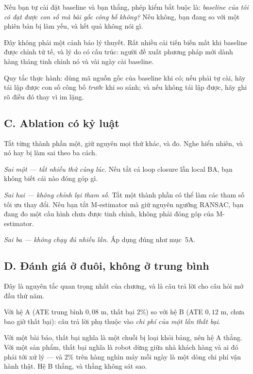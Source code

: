 \documentclass[../../vslam.tex]{subfiles}
\begin{document}
Nếu bạn tự cài đặt baseline và bạn thắng, phép kiểm bắt buộc là: \emph{baseline của tôi có đạt được con số mà bài gốc công bố không?} Nếu không, bạn đang so với một phiên bản bị làm yếu, và kết quả không nói gì.

Đây không phải một cảnh báo lý thuyết. Rất nhiều cải tiến biến mất khi baseline được chỉnh tử tế, và lý do có cấu trúc: người đề xuất phương pháp mới dành hàng tháng tinh chỉnh nó và vài ngày cài baseline.

Quy tắc thực hành: dùng mã nguồn gốc của baseline khi có; nếu phải tự cài, hãy tái lập được con số công bố \emph{trước} khi so sánh; và nếu không tái lập được, hãy ghi rõ điều đó thay vì im lặng.

\subsection{C. Ablation có kỷ luật}

Tắt từng thành phần một, giữ nguyên mọi thứ khác, và đo. Nghe hiển nhiên, và nó hay bị làm sai theo ba cách.

\emph{Sai một --- tắt nhiều thứ cùng lúc.} Nếu tắt cả loop closure lẫn local BA, bạn không biết cái nào đóng góp gì.

\emph{Sai hai --- không chỉnh lại tham số.} Tắt một thành phần có thể làm các tham số tối ưu thay đổi. Nếu bạn tắt M-estimator mà giữ nguyên ngưỡng RANSAC, bạn đang đo một cấu hình chưa được tinh chỉnh, không phải đóng góp của M-estimator.

\emph{Sai ba --- không chạy đủ nhiều lần.} Áp dụng đúng như mục~5A.

\subsection{D. Đánh giá ở đuôi, không ở trung bình}

Đây là nguyên tắc quan trọng nhất của chương, và là câu trả lời cho câu hỏi mở đầu thứ năm.

Với hệ A (ATE trung bình \(0{,}08\) m, thất bại \(2\%\)) so với hệ B (ATE \(0{,}12\) m, chưa bao giờ thất bại): câu trả lời phụ thuộc vào \emph{chi phí của một lần thất bại}.

Với một bài báo, thất bại nghĩa là một chuỗi bị loại khỏi bảng, nên hệ A thắng. Với một sản phẩm, thất bại nghĩa là robot dừng giữa nhà khách hàng và ai đó phải tới xử lý --- và \(2\%\) trên hàng nghìn máy mỗi ngày là một dòng chi phí vận hành thật. Hệ B thắng, và thắng không sát sao.
\end{document}
